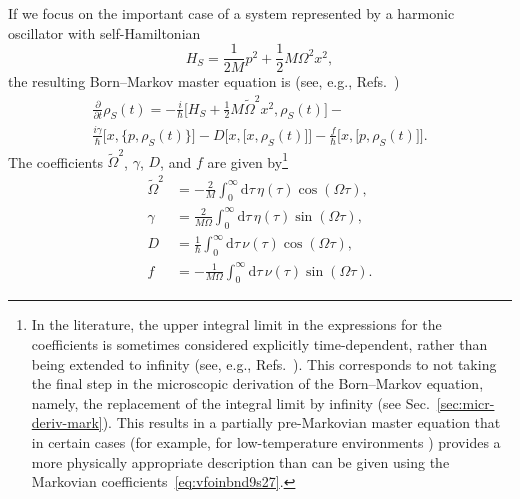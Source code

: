 \documentclass[3p,sort&compress,12pt]{elsarticle}
\newcommand{\D}{\ensuremath{\mathrm{d}}}
\newcommand{\I}{\ensuremath{i}}
\newcommand{\op}[1]{#1}
\begin{document}
If we focus on the important case of a system represented by a harmonic oscillator with self-Hamiltonian
%
\begin{equation}
  \label{eq:sfsfsdfy7jaa11}
  \op{H}_S =  \frac{1}{2M}p^2 +
  \frac{1}{2}M\Omega^2x^2,
\end{equation}
%
the resulting Born--Markov master equation is (see, e.g., Refs.~\cite{Breuer:2002:oq,Zurek:2002:ii,Schlosshauer:2007:un})
%
\begin{multline}
\label{eq:vfoinbnd9s27}
  \frac{\partial}{\partial t} \op{\rho}_S(t) 
  = -\frac{\I}{\hbar} \bigl[ \op{H}_S + \frac{1}{2}M
    \widetilde{\Omega}^2 x^2, \op{\rho}_S(t) \bigr]
  - \\ \frac{\I \gamma}{\hbar} \bigl[ x, \bigr\{ p,
      \op{\rho}_S(t) \bigr\} \bigr] 
 - D \bigl[ x, \bigl[ x, \op{\rho}_S(t) \bigr]
\bigr] 
- \frac{f}{\hbar} \bigl[ x, \bigl[ p, \op{\rho}_S(t) \bigr]
\bigr].
\end{multline}
%
The coefficients $\widetilde{\Omega}^2$, $\gamma$, $D$, and $f$ are given by\footnote{In the literature, the upper integral limit in the expressions for the coefficients is sometimes  considered explicitly time-dependent, rather than being extended to infinity (see, e.g., Refs.~\cite{Paz:2001:aa,Zurek:2002:ii}). This corresponds to not taking the final step in the microscopic derivation of the Born--Markov equation, namely, the replacement of the integral limit by infinity (see Sec.~\ref{sec:micr-deriv-mark}). This results in a partially pre-Markovian master equation that in certain cases  (for example, for low-temperature environments \cite{Unruh:1989:rc,Lombardo:2005:ia}) provides a more physically appropriate description than can be given using the Markovian coefficients~\eqref{eq:vfoinbnd9s27}.}
%
\begin{subequations}\label{eq:jcsfr09355378}
\begin{align}
  \widetilde{\Omega}^2 &= - \frac{2}{M} \int_0^\infty \D \tau \,
  \eta(\tau) \cos\left( \Omega \tau \right), \label{eq:caytcs1} \\
  \gamma &= \frac{2}{M\Omega} \int_0^\infty \D \tau \,
  \eta(\tau) \sin\left( \Omega \tau \right), \label{eq:caytcs2} \\
  D &=  \frac{1}{\hbar} \int_0^\infty \D \tau \,
  \nu(\tau) \cos\left( \Omega \tau \right), \label{eq:caytcs3}  \\
  f &= - \frac{1}{M\Omega} \int_0^\infty \D \tau \,
  \nu(\tau) \sin\left( \Omega \tau \right). \label{eq:caytcs4} 
\end{align}
\end{subequations}
\end{document}
